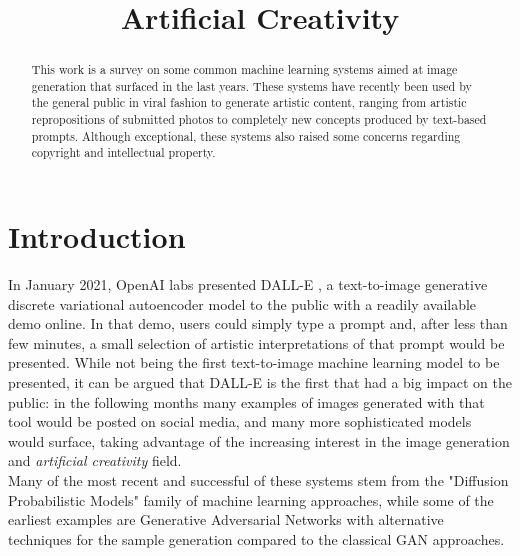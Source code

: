 \documentclass[conference]{IEEEtran}
\begin{document}
\title{Artificial Creativity}

\author{
}

\maketitle

\begin{abstract}
This work is a survey on some common machine learning systems aimed at image generation that surfaced in the last years. These systems have recently been used by the general public in viral fashion to generate artistic content, ranging from artistic repropositions of submitted photos to completely new concepts produced by text-based prompts. Although exceptional, these systems also raised some concerns regarding copyright and intellectual property.
\end{abstract}

\section{Introduction}
In January 2021, OpenAI labs presented DALL-E \cite{dallepaper}, a text-to-image generative discrete variational autoencoder model to the public with a readily available demo online. In that demo, users could simply type a prompt and, after less than few minutes, a small selection of artistic interpretations of that prompt would be presented. While not being the first text-to-image machine learning model to be presented, it can be argued that DALL-E is the first that had a big impact on the public: in the following months many examples of images generated with that tool would be posted on social media, and many more sophisticated models would surface, taking advantage of the increasing interest in the image generation and \textit{artificial creativity} field.\\
Many of the most recent and successful of these systems stem from the "Diffusion Probabilistic Models" \cite{diffusionmodels} family of machine learning approaches, while some of the earliest examples are Generative Adversarial Networks \cite{GANs} with alternative techniques for the sample generation \cite{stylegan} compared to the classical GAN approaches.
\end{document}
